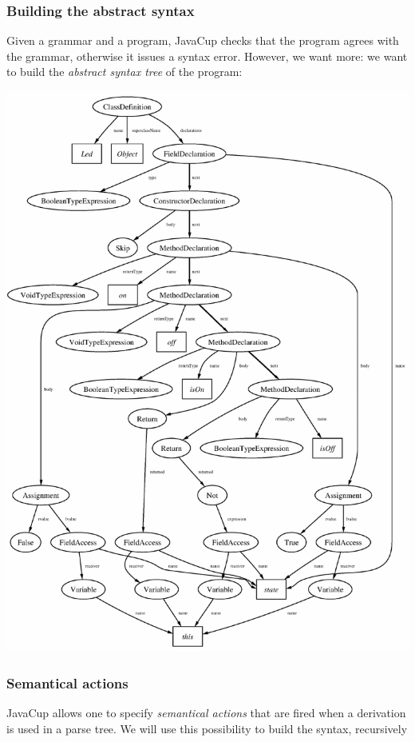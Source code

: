 \documentclass[11pt]{beamer}  %
\begin{document}
\begin{frame}\frametitle{Building the abstract syntax}

Given a grammar and a program, JavaCup checks that the program agrees
with the grammar, otherwise it issues a syntax error. However, we want more:
we want to build the \emph{abstract syntax tree} of the program:

\begin{center}
\includegraphics[scale=0.4]{pictures/led_logica.pdf}
\end{center}

\end{frame}

\begin{frame}[fragile]\frametitle{Semantical actions}

\begin{greenbox}{}
JavaCup allows one to specify \emph{semantical actions} that are fired when
a derivation is used in a parse tree. We will use this possibility to
build the syntax, recursively
\end{greenbox}

\end{frame}
\end{document}
